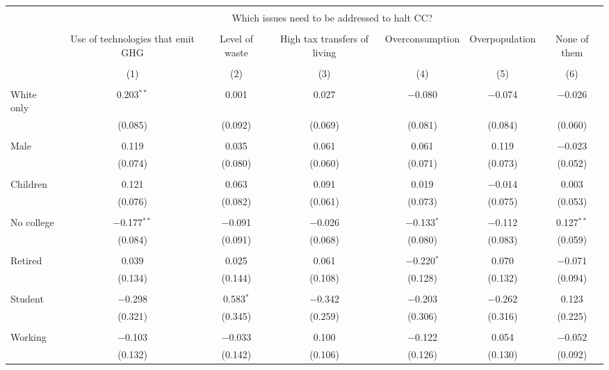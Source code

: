
\begin{tabular}{@{\extracolsep{5pt}}lcccccc} 
\\[-1.8ex]\hline 
\hline \\[-1.8ex] 
 & \multicolumn{6}{c}{Which issues need to be addressed to halt CC?} \\ 
\cline{2-7} 
\\[-1.8ex] & Use of technologies that emit GHG & Level of waste & High tax transfers of living & Overconsumption & Overpopulation & None of them \\ 
\\[-1.8ex] & (1) & (2) & (3) & (4) & (5) & (6)\\ 
\hline \\[-1.8ex] 
 White only & 0.203$^{**}$ & 0.001 & 0.027 & $-$0.080 & $-$0.074 & $-$0.026 \\ 
  & (0.085) & (0.092) & (0.069) & (0.081) & (0.084) & (0.060) \\ 
  & & & & & & \\ 
 Male & 0.119 & 0.035 & 0.061 & 0.061 & 0.119 & $-$0.023 \\ 
  & (0.074) & (0.080) & (0.060) & (0.071) & (0.073) & (0.052) \\ 
  & & & & & & \\ 
 Children & 0.121 & 0.063 & 0.091 & 0.019 & $-$0.014 & 0.003 \\ 
  & (0.076) & (0.082) & (0.061) & (0.073) & (0.075) & (0.053) \\ 
  & & & & & & \\ 
 No college & $-$0.177$^{**}$ & $-$0.091 & $-$0.026 & $-$0.133$^{*}$ & $-$0.112 & 0.127$^{**}$ \\ 
  & (0.084) & (0.091) & (0.068) & (0.080) & (0.083) & (0.059) \\ 
  & & & & & & \\ 
 Retired & 0.039 & 0.025 & 0.061 & $-$0.220$^{*}$ & 0.070 & $-$0.071 \\ 
  & (0.134) & (0.144) & (0.108) & (0.128) & (0.132) & (0.094) \\ 
  & & & & & & \\ 
 Student & $-$0.298 & 0.583$^{*}$ & $-$0.342 & $-$0.203 & $-$0.262 & 0.123 \\ 
  & (0.321) & (0.345) & (0.259) & (0.306) & (0.316) & (0.225) \\ 
  & & & & & & \\ 
 Working & $-$0.103 & $-$0.033 & 0.100 & $-$0.122 & 0.054 & $-$0.052 \\ 
  & (0.132) & (0.142) & (0.106) & (0.126) & (0.130) & (0.092) \\ 

\end{tabular}

